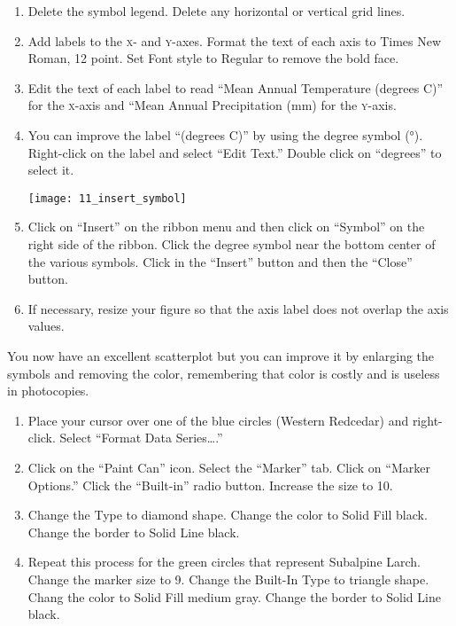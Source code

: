 \documentclass[12pt, hidelinks]{exam}
\newcommand*\axis[1]{{\scshape #1}-axis}
\begin{document}
\begin{questions}
\begin{enumerate}[resume]
	\item Delete the symbol legend. Delete any horizontal or vertical grid lines.

	\item Add labels to the \textsc{x}- and \textsc{y}-axes. Format the text of each axis to Times New Roman, 12 point. Set Font style to Regular to remove the bold face.

	\item Edit the text of each label to read “Mean Annual Temperature (degrees C)” for the \axis{x} and “Mean Annual Precipitation (mm) for the \axis{y}.

	\item You can improve the label “(degrees C)” by using the degree symbol (°). Right-click on the label and select “Edit Text.” Double click on “degrees” to select it.

\begin{center}
	\texttt{[image: 11\_insert\_symbol]}
\end{center}

	\item Click on “Insert” on the ribbon menu and then click on “Symbol” on the right side of the ribbon. Click the degree symbol near the bottom center of the various symbols. Click in the “Insert” button and then the “Close” button. 
	
	\item If necessary, resize your figure so that the axis label does not overlap the axis values.
\end{enumerate}
 
You now have an excellent scatterplot but you can improve it by enlarging the symbols and removing the color, remembering that color is costly and is useless in photocopies.

\begin{enumerate}[resume]
	\item Place your cursor over one of the blue circles (Western Redcedar) and right-click. Select “Format Data Series\dots.” 

	\item Click on the “Paint Can” icon. Select the “Marker” tab. Click on “Marker Options.” Click the “Built-in” radio button.  Increase the size to 10.
	
	\item Change the Type to diamond shape. Change the color to Solid Fill black. Change the border to Solid Line black.

	\item Repeat this process for the green circles that represent Subalpine Larch. Change the marker size to 9. Change the Built-In Type to triangle shape. Chang the color to Solid Fill medium gray.  Change the border to Solid Line black.


\end{enumerate}
\end{questions}
\end{document}
